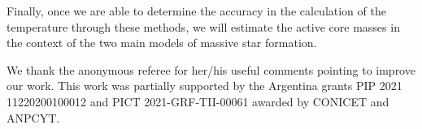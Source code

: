 \documentclass[baaa]{baaa}
\begin{document}

Finally, once we are able to determine the accuracy in the calculation of the temperature through these methods, we will estimate the active core masses in the context of the two main models of massive star formation.






\begin{acknowledgement}
We thank the anonymous referee for her/his useful comments pointing to improve our work.
This work was partially supported by the Argentina grants PIP 2021 11220200100012 and PICT 2021-GRF-TII-00061 awarded by CONICET and ANPCYT.
\end{acknowledgement}



\small

 
\end{document}
